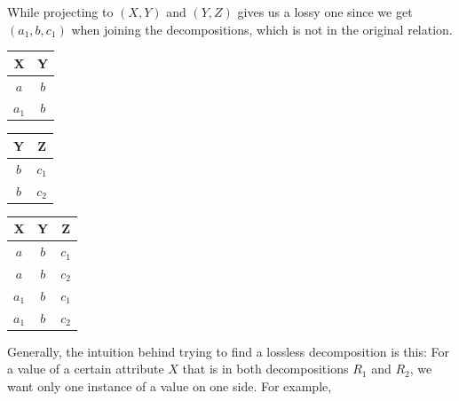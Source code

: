 \begin{example}
\begin{table}[H]
\begin{minipage}{.32\textwidth}
\begin{tabular}{|c|c|c|}
          \hline
        \end{tabular}
        \label{tab:ex71}
      \end{minipage}
    \end{table}
    While projecting to $(X, Y)$ and $(Y, Z)$ gives us a lossy one since we get $(a_1, b, c_1)$ when joining the decompositions, which is not in the original relation. 
    \begin{table}[H]
      \centering
      \begin{minipage}{.32\textwidth}
        \centering
        \begin{tabular}{|c|c|}
          \hline
          \textbf{X} & \textbf{Y} \\
          \hline
          $a$ & $b$ \\
          $a_1$ & $b$ \\
          \hline
        \end{tabular}
        \label{tab:ex8}
      \end{minipage}
      \begin{minipage}{.32\textwidth}
        \centering
        \begin{tabular}{|c|c|}
          \hline
          \textbf{Y} & \textbf{Z} \\
          \hline
          $b$ & $c_1$ \\
          $b$ & $c_2$ \\
          \hline
        \end{tabular}
        \label{tab:ex9}
      \end{minipage}
      \begin{minipage}{.32\textwidth}
        \centering
        \begin{tabular}{|c|c|c|}
          \hline
          \textbf{X} & \textbf{Y} & \textbf{Z}\\
          \hline
          $a$ & $b$ & $c_1$ \\
          $a$ & $b$ & $c_2$ \\
          $a_1$ & $b$ & $c_1$ \\
          $a_1$ & $b$ & $c_2$ \\
          \hline
        \end{tabular}
        \label{tab:ex10}
      \end{minipage}
    \end{table}
    Generally, the intuition behind trying to find a lossless decomposition is this: For a value of a certain attribute $X$ that is in both decompositions $R_1$ and $R_2$, we want only one instance of a value on one side. For example, 

\end{example}
